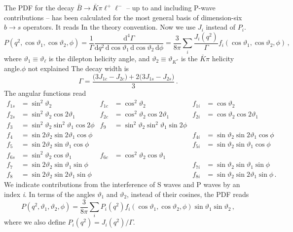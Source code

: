 \documentclass[aps,prd,reprint,nofootinbib,preprintnumbers]{revtex4}
\newcommand{\dd}{\text{d}}
\renewcommand{\theta}{\vartheta}
\newcommand{\fred}[1]{{\color{brown!85!black}#1}}
\begin{document}
The PDF for the decay $\bar{B}\to\bar{K}\pi\ell^+\ell^-$ -- up to and including P-wave contributions -- has been calculated
for the most general basis of dimension-six $b\to s$ operators. It reads \cite{Blake:2012mb,Bobeth:2012vn}\fred{In the theory convention. Now we use $J_i$ instead of $P_i$.}
\begin{equation}
    P(q^2, \cos\theta_1, \cos\theta_2, \phi) = \frac{1}{\Gamma} \frac{\dd^4\Gamma}{\dd q^2\,\dd \cos\theta_1\,\dd \cos\theta_2\,\dd \phi} = \frac{3}{8\pi} \sum_i \frac{J_{i}(q^2)}{\Gamma} f_i(\cos\theta_1, \cos\theta_2, \phi)\,,
\end{equation}
where $\theta_1 \equiv \theta_\ell$ is the dilepton helicity angle, and $\theta_2 \equiv \theta_{K^*}$ is the $\bar{K}\pi$ helicity angle.\fred{$\phi$ not explained}
The decay width is
\begin{equation}
    \Gamma = \frac{\big(3 J_{1c} - J_{2c}\big) + 2\big(3J_{1s} - J_{2s}\big)}{3}\,.
\end{equation}
The angular functions read \cite{Blake:2012mb,Bobeth:2012vn}
\begin{equation}
\begin{aligned}
    f_{1s} & = \sin^2\theta_2 &
    f_{1c} & = \cos^2\theta_2 &
    f_{1i} & = \cos\theta_2\\
    f_{2s} & = \sin^2\theta_2 \cos 2\theta_1 &
    f_{2c} & = \cos^2\theta_2 \cos 2\theta_1 &
    f_{2i} & = \cos\theta_2 \cos 2\theta_1\\
    f_{3}  & = \sin^2\theta_2\sin^2\theta_1 \cos 2\phi &
    f_{9}  & = \sin^2\theta_2\sin^2\theta_1 \sin 2\phi\\
    f_{4}  & = \sin 2\theta_2 \sin 2\theta_1 \cos\phi & & &
    f_{4i} & = \sin\theta_2 \sin 2\theta_1 \cos\phi\\
    f_{5}  & = \sin 2\theta_2 \sin \theta_1 \cos\phi & & &
    f_{5i} & = \sin\theta_2 \sin \theta_1 \cos\phi\\
    f_{6s} & = \sin^2\theta_2 \cos\theta_1 &
    f_{6c} & = \cos^2\theta_2 \cos\theta_1\\
    f_{7}  & = \sin 2\theta_2 \sin \theta_1 \sin\phi & & &
    f_{7i} & = \sin\theta_2 \sin \theta_1 \sin\phi\\
    f_{8}  & = \sin 2\theta_2 \sin 2\theta_1 \sin\phi & & &
    f_{8i} & = \sin\theta_2 \sin 2\theta_1 \sin\phi\,.
\end{aligned}
\end{equation}
We indicate contributions from the interference of S waves and P waves by an index \emph{i}. In terms of the angles $\theta_1$ and $\theta_2$, instead of their cosines, the PDF reads
\begin{equation}
    P(q^2, \theta_1, \theta_2, \phi) = \frac{3}{8\pi} \sum_i P_i(q^2) f_i(\cos\theta_1, \cos\theta_2, \phi) \sin\theta_1 \sin\theta_2\,,
\end{equation}
where we also define $P_i(q^2) = J_i(q^2) / \Gamma$.\\
\end{document}
